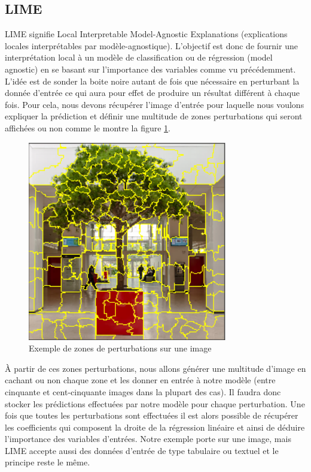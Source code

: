 \subsection{LIME}
LIME signifie Local Interpretable Model-Agnostic Explanations (explications locales interprétables par modèle-agnostique). L'objectif est donc de fournir une interprétation local à un modèle de classification ou de régression (model agnostic) en se basant sur l’importance des variables comme vu précédemment. L'idée est de sonder la boite noire autant de fois que nécessaire en perturbant la donnée d'entrée ce qui aura pour effet de produire un résultat différent à chaque fois. Pour cela, nous devons récupérer l'image d'entrée pour laquelle nous voulons expliquer la prédiction et définir une multitude de zones perturbations qui seront affichées ou non comme le montre la figure \ref{perturbationExemple}.
\begin{figure}[h]
\centering
\includegraphics[scale=0.6]{src_img/perturbationExemple.png}
\caption{Exemple de zones de perturbations sur une image}
\label{perturbationExemple}
\end{figure}
À partir de ces zones perturbations, nous allons générer une multitude d'image en cachant ou non chaque zone et les donner en entrée à notre modèle (entre cinquante et cent-cinquante images dans la plupart des cas). Il faudra donc stocker les prédictions effectuées par notre modèle pour chaque perturbation. Une fois que toutes les perturbations sont effectuées il est alors possible de récupérer les coefficients qui composent la droite de la régression linéaire et ainsi de déduire l'importance des variables d'entrées. Notre exemple porte sur une image, mais LIME accepte aussi des données d'entrée de type tabulaire ou textuel et le principe reste le même.\par


